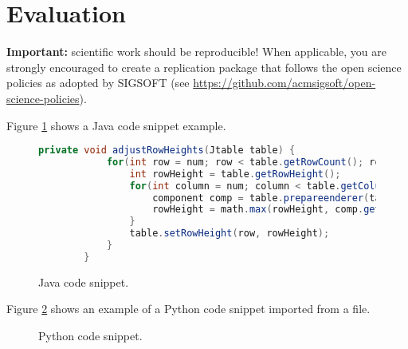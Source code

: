 \section{Evaluation}
\textbf{Important:} scientific work should be reproducible! 
When applicable, you are strongly encouraged to create a replication package that follows the open science policies as adopted by SIGSOFT (see \url{https://github.com/acmsigsoft/open-science-policies}).

\medskip

\lipsum[2-3]

Figure \ref{fig:CodeJava} shows a Java code snippet example.

\begin{figure}
    \centering
    \begin{lstlisting}[language=Java]
        private void adjustRowHeights(Jtable table) {
            for(int row = num; row < table.getRowCount(); row++) {
                int rowHeight = table.getRowHeight();
                for(int column = num; column < table.getColumnCount(); column++) {
                    component comp = table.prepareenderer(table.getCellenderer(row, column), row, column);
                    rowHeight = math.max(rowHeight, comp.getPreferredSize().height);
                }
                table.setRowHeight(row, rowHeight);
            }
        }
    \end{lstlisting}
    \caption{Java code snippet.}
    \label{fig:CodeJava}
\end{figure}


Figure \ref{fig:CodePython} shows an example of a Python code snippet imported from a file.

\begin{figure}
    \centering
    
    \caption{Python code snippet.}
    \label{fig:CodePython}
\end{figure}
